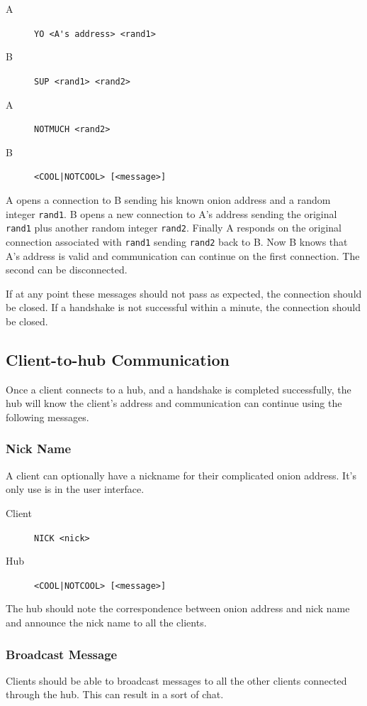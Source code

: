 \documentclass{article}
\begin{document}
\begin{description}
\item[A] \verb+YO <A's address> <rand1>+
\item[B] \verb+SUP <rand1> <rand2>+
\item[A] \verb+NOTMUCH <rand2>+
\item[B] \verb+<COOL|NOTCOOL> [<message>]+
\end{description}

A opens a connection to B sending his known onion address and a random integer \verb+rand1+.  B opens a new connection to A's address sending the original \verb+rand1+ plus another random integer \verb+rand2+.  Finally A responds on the original connection associated with \verb+rand1+ sending \verb+rand2+ back to B.  Now B knows that A's address is valid and communication can continue on the first connection.  The second can be disconnected.

If at any point these messages should not pass as expected, the connection should be closed.  If a handshake is not successful within a minute, the connection should be closed.

\subsection{Client-to-hub Communication}
Once a client connects to a hub, and a handshake is completed successfully, the hub will know the client's address and communication can continue using the following messages.

\subsubsection{Nick Name}
A client can optionally have a nickname for their complicated onion address.  It's only use is in the user interface.

\begin{description}
\item[Client] \verb+NICK <nick>+
\item[Hub] \verb+<COOL|NOTCOOL> [<message>]+
\end{description}

The hub should note the correspondence between onion address and nick name and announce the nick name to all the clients.

\subsubsection{Broadcast Message}
Clients should be able to broadcast messages to all the other clients connected through the hub.  This can result in a sort of chat.
\end{document}
